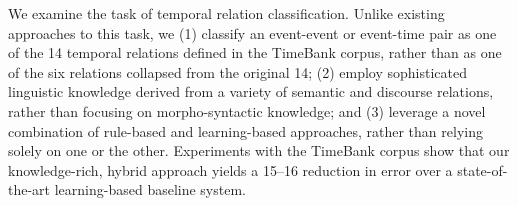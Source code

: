 We examine the task of temporal relation classification. Unlike existing approaches to this task, we (1) classify an event-event or event-time pair as
 one of the 14 temporal relations defined in the TimeBank corpus, rather than as
 one of the six relations collapsed from the original 14; (2) employ
 sophisticated linguistic knowledge derived from a variety of semantic and
 discourse relations, rather than focusing on morpho-syntactic knowledge; and
 (3) leverage a novel combination of rule-based and learning-based approaches,
 rather than relying solely on one or the other. Experiments with the TimeBank
 corpus show that our knowledge-rich, hybrid approach yields a 15--16%
 reduction in error over a state-of-the-art learning-based baseline system.

